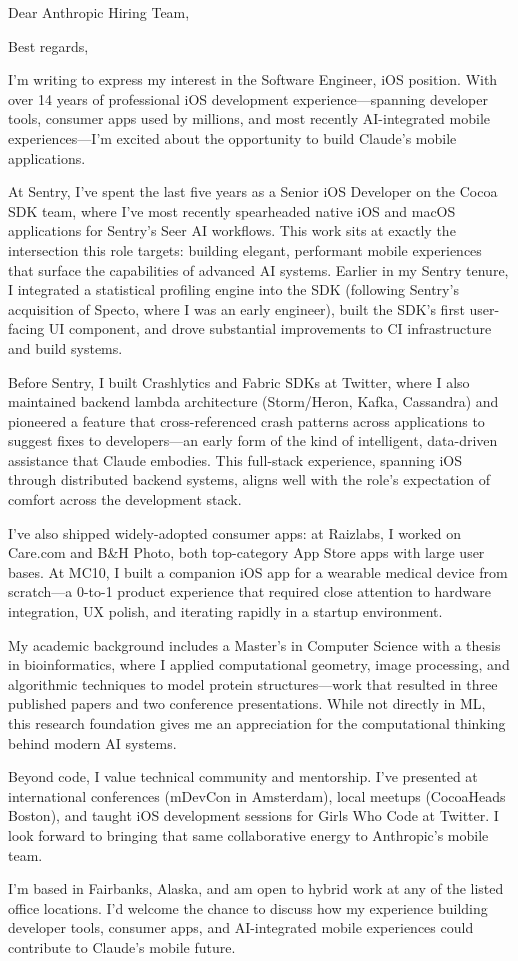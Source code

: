 \documentclass[11pt,a4paper,sans]{moderncv}
\begin{document}
\date{\today}
\opening{Dear Anthropic Hiring Team,}
\closing{Best regards,}
\makelettertitle

I'm writing to express my interest in the Software Engineer, iOS position. With over 14 years of professional iOS development experience---spanning developer tools, consumer apps used by millions, and most recently AI-integrated mobile experiences---I'm excited about the opportunity to build Claude's mobile applications.

At Sentry, I've spent the last five years as a Senior iOS Developer on the Cocoa SDK team, where I've most recently spearheaded native iOS and macOS applications for Sentry's Seer AI workflows. This work sits at exactly the intersection this role targets: building elegant, performant mobile experiences that surface the capabilities of advanced AI systems. Earlier in my Sentry tenure, I integrated a statistical profiling engine into the SDK (following Sentry's acquisition of Specto, where I was an early engineer), built the SDK's first user-facing UI component, and drove substantial improvements to CI infrastructure and build systems.

Before Sentry, I built Crashlytics and Fabric SDKs at Twitter, where I also maintained backend lambda architecture (Storm/Heron, Kafka, Cassandra) and pioneered a feature that cross-referenced crash patterns across applications to suggest fixes to developers---an early form of the kind of intelligent, data-driven assistance that Claude embodies. This full-stack experience, spanning iOS through distributed backend systems, aligns well with the role's expectation of comfort across the development stack.

I've also shipped widely-adopted consumer apps: at Raizlabs, I worked on Care.com and B\&H Photo, both top-category App Store apps with large user bases. At MC10, I built a companion iOS app for a wearable medical device from scratch---a 0-to-1 product experience that required close attention to hardware integration, UX polish, and iterating rapidly in a startup environment.

My academic background includes a Master's in Computer Science with a thesis in bioinformatics, where I applied computational geometry, image processing, and algorithmic techniques to model protein structures---work that resulted in three published papers and two conference presentations. While not directly in ML, this research foundation gives me an appreciation for the computational thinking behind modern AI systems.

Beyond code, I value technical community and mentorship. I've presented at international conferences (mDevCon in Amsterdam), local meetups (CocoaHeads Boston), and taught iOS development sessions for Girls Who Code at Twitter. I look forward to bringing that same collaborative energy to Anthropic's mobile team.

I'm based in Fairbanks, Alaska, and am open to hybrid work at any of the listed office locations. I'd welcome the chance to discuss how my experience building developer tools, consumer apps, and AI-integrated mobile experiences could contribute to Claude's mobile future.

\makeletterclosing
\end{document}
